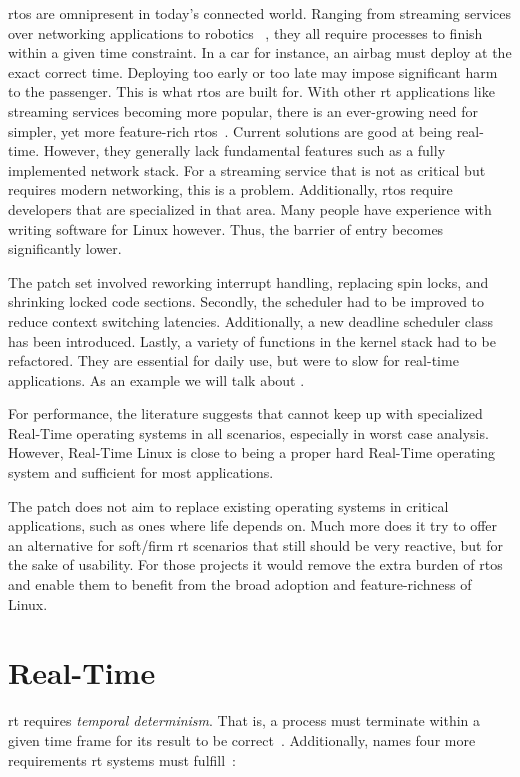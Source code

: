\documentclass[10pt,twocolumn,a4paper]{article}
\begin{document}
\acrfull{rtos} are omnipresent in today's connected world.
Ranging from streaming services over networking applications to robotics ~\cite{buttazzo_hard_1997}, they all require processes to finish within a given time constraint.
In a car for instance, an airbag must deploy at the exact correct time.
Deploying too early or too late may impose significant harm to the passenger.
This is what \acrshort{rtos} are built for.
With other \acrshort{rt} applications like streaming services becoming more popular, there is an ever-growing need for simpler, yet more feature-rich \acrshort{rtos}~\cite{reghenzani_realtime_2019}.
Current solutions are good at being real-time.
However, they generally lack fundamental features such as a fully implemented network stack.
For a streaming service that is not as critical but requires modern networking, this is a problem.
Additionally, \acrshort{rtos} require developers that are specialized in that area.
Many people have experience with writing software for Linux however.
Thus, the barrier of entry becomes significantly lower.


The  patch set involved reworking interrupt handling, replacing spin locks, and shrinking locked code sections.
Secondly, the scheduler had to be improved to reduce context switching latencies.
Additionally, a new deadline scheduler class has been introduced.
Lastly, a variety of functions in the kernel stack had to be refactored.
They are essential for daily use, but were to slow for real-time applications.
As an example we will talk about .

For performance, the literature suggests that  cannot keep up with specialized Real-Time operating systems in all scenarios, especially in worst case analysis.
However, Real-Time Linux is close to being a proper hard Real-Time operating system and sufficient for most applications.

The patch does not aim to replace existing operating systems in critical applications, such as ones where life depends on.
Much more does it try to offer an alternative for soft/firm \acrshort{rt} scenarios that still should be very reactive, but for the sake of usability.
For those projects it would remove the extra burden of  \acrshort{rtos} and enable them to benefit from the broad adoption and feature-richness of Linux.
\section{Real-Time}\label{subsec:real-time}
\acrfull{rt} requires \emph{temporal determinism}.
That is, a process must terminate within a given time frame for its result to be correct~\cite{reghenzani_realtime_2019}.
Additionally, \citeauthor{buttazzo_hard_1997} names four more requirements \acrshort{rt} systems must fulfill~\cite{buttazzo_hard_1997}:
\end{document}
